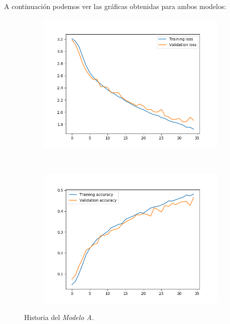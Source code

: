 \documentclass[11pt,a4paper]{article}
\begin{document}
A continuación podemos ver las gráficas obtenidas para ambos modelos:

\begin{figure}[H]
  \centering
  \begin{subfigure}{.5\textwidth}
    \centering
    \includegraphics[scale=0.4]{img/deep1-drop-loss-35.png}
    \label{fig:deep1-drop-loss-35}
  \end{subfigure}%
  ~ \quad
  \begin{subfigure}{.5\textwidth}
    \centering
    \includegraphics[scale=0.4]{img/deep1-drop-acc-35.png}
    \label{fig:deep1-drop-acc-35}
  \end{subfigure}
  \caption{Historia del \textit{Modelo A}.}
  \label{fig:history-deep1-drop-35}
\end{figure}
\end{document}
